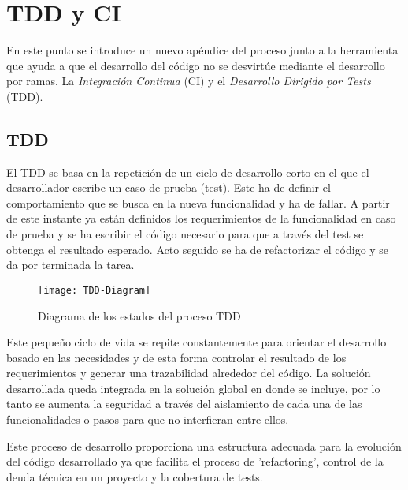 

\section{TDD y CI}
\label{sec:tdd-ci}

\par En este punto se introduce un nuevo apéndice del proceso junto a la herramienta que ayuda a que el desarrollo del código no se desvirtúe mediante el desarrollo por ramas. La \emph{Integración Continua} (CI) y el \emph{Desarrollo Dirigido por Tests} (TDD).

\subsection{TDD}
\label{sub:tdd}

\par El TDD se basa en la repetición de un ciclo de desarrollo corto en el que el desarrollador escribe un caso de prueba (test). Este ha de definir el comportamiento que se busca en la nueva funcionalidad y ha de fallar. A partir de este instante ya están definidos los requerimientos de la funcionalidad en caso de prueba y se ha escribir el código necesario para que a través del test se obtenga el resultado esperado. Acto seguido se ha de refactorizar el código y se da por terminada la tarea.

\begin{figure}[H]
    \centering
    \texttt{[image: TDD-Diagram]}
    \caption{Diagrama de los estados del proceso TDD}
    \label{fig:TDD-Diagram}
\end{figure}

\par Este pequeño ciclo de vida se repite constantemente para orientar el desarrollo basado en las necesidades y de esta forma controlar el resultado de los requerimientos y generar una trazabilidad alrededor del código. La solución desarrollada queda integrada en la solución global en donde se incluye, por lo tanto se aumenta la seguridad a través del aislamiento de cada una de las funcionalidades o pasos para que no interfieran entre ellos.

\par Este proceso de desarrollo proporciona una estructura adecuada para la evolución del código desarrollado ya que facilita el proceso de 'refactoring', control de la deuda técnica en un proyecto y la cobertura de tests.

